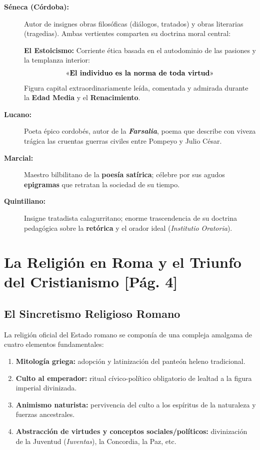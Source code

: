\documentclass[11pt,letterpaper]{article}
\begin{document}
\begin{description}
  \item[\textbf{Séneca (Córdoba):}]
  Autor de insignes obras filosóficas (diálogos, tratados) y obras literarias (tragedias). Ambas vertientes comparten su doctrina moral central:
  \begin{subbox}
    \textbf{El Estoicismo:} Corriente ética basada en el autodominio de las pasiones y la templanza interior:
    \[
      \text{\guillemotleft\textbf{El individuo es la norma de toda virtud}\guillemotright}
    \]
    Figura capital extraordinariamente leída, comentada y admirada durante la \textbf{Edad Media} y el \textbf{Renacimiento}.
  \end{subbox}
  \item[\textbf{Lucano:}] Poeta épico cordobés, autor de la \textbf{\textit{Farsalia}}, poema que describe con viveza trágica las cruentas guerras civiles entre Pompeyo y Julio César.
  \item[\textbf{Marcial:}] Maestro bilbilitano de la \textbf{poesía satírica}; célebre por sus agudos \textbf{epigramas} que retratan la sociedad de su tiempo.
  \item[\textbf{Quintiliano:}] Insigne tratadista calagurritano; enorme trascendencia de su doctrina pedagógica sobre la \textbf{retórica} y el orador ideal (\textit{Institutio Oratoria}).
\end{description}

\bigskip

\newpage
\section{La Religión en Roma y el Triunfo del Cristianismo \hfill\normalfont\small\color{gray}[Pág. 4]}

\subsection{El Sincretismo Religioso Romano}
La religión oficial del Estado romano se componía de una compleja amalgama de cuatro elementos fundamentales:
\begin{enumerate}
  \item \textbf{Mitología griega:} adopción y latinización del panteón heleno tradicional.
  \item \textbf{Culto al emperador:} ritual cívico-político obligatorio de lealtad a la figura imperial divinizada.
  \item \textbf{Animismo naturista:} pervivencia del culto a los espíritus de la naturaleza y fuerzas ancestrales.
  \item \textbf{Abstracción de virtudes y conceptos sociales/políticos:} divinización de la Juventud (\textit{Iuventas}), la Concordia, la Paz, etc.
\end{enumerate}
\end{document}
